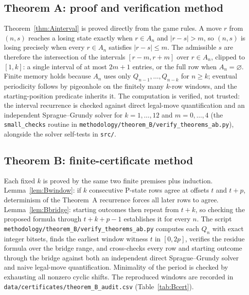 \documentclass[11pt]{article}
\theoremstyle{remark}
\begin{document}
\subsection{Theorem A: proof and verification method}\label{sec:methodA}
Theorem~\ref{thm:Ainterval} is proved directly from the game rules. A move $r$ from $(n,s)$ reaches a losing state exactly when $r\in A_n$ and $|r-s|>m$, so $(n,s)$ is losing precisely when every $r\in A_n$ satisfies $|r-s|\le m$. The admissible $s$ are therefore the intersection of the intervals $[r-m,r+m]$ over $r\in A_n$, clipped to $[1,k]$: a single interval of at most $2m+1$ entries, or the full row when $A_n=\varnothing$. Finite memory holds because $A_n$ uses only $Q_{n-1},\ldots,Q_{n-k}$ for $n\ge k$; eventual periodicity follows by pigeonhole on the finitely many $k$-row windows, and the starting-position predicate inherits it.
The computation is verified, not trusted: the interval recurrence is checked against direct legal-move quantification and an independent Sprague--Grundy solver for $k=1,\ldots,12$ and $m=0,\ldots,4$ (the \texttt{small\_checks} routine in \texttt{methodology/theorem\_B/verify\_theorems\_ab.py}), alongside the solver self-tests in \texttt{src/}.

\subsection{Theorem B: finite-certificate method}\label{sec:methodB}
Each fixed $k$ is proved by the same two finite premises plus induction. Lemma~\ref{lem:Bwindow}: if $k$ consecutive P-state rows agree at offsets $t$ and $t+p$, determinism of the Theorem~A recurrence forces all later rows to agree. Lemma~\ref{lem:Bbridge}: starting outcomes then repeat from $t+k$, so checking the proposed formula through $t+k+p-1$ establishes it for every $n$.
The script \texttt{methodology/theorem\_B/verify\_theorems\_ab.py} computes each $Q_n$ with exact integer bitsets, finds the earliest window witness $t$ in $[0,2p]$, verifies the residue formula over the bridge range, and cross-checks every row and starting outcome through the bridge against both an independent direct Sprague--Grundy solver and naive legal-move quantification. Minimality of the period is checked by exhausting all nonzero cyclic shifts. The reproduced windows are recorded in \texttt{data/certificates/theorem\_B\_audit.csv} (Table~\ref{tab:Bcert}).
\end{document}
